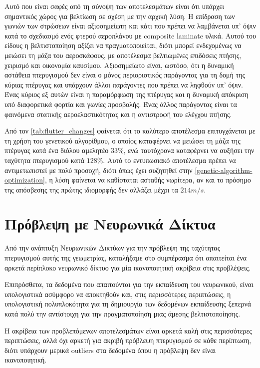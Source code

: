 Αυτό που είναι σαφές από τη σύνοψη των αποτελεσμάτων είναι ότι υπάρχει σημαντικός χώρος για βελτίωση σε σχέση με την αρχική λύση. 
Η επίδραση των γωνιών των στρώσεων είναι αξιοσημείωτη και κάτι που πρέπει να λαμβάνεται υπ' όψιν κατά το σχεδιασμό ενός φτερού αεροπλάνου με \textlatin{composite laminate} υλικά.
Αυτού του είδους η βελτιστοποίηση αξίζει να πραγματοποιείται, διότι μπορεί ενδεχομένως να μειώσει τη μάζα του αεροσκάφους, με αποτέλεσμα βελτιωμένες επιδόσεις πτήσης, χειρισμό και οικονομία καυσίμου.
Αξιοσημείωτο είναι, ωστόσο, ότι η δυναμική αστάθεια πτερυγισμού δεν είναι ο μόνος περιοριστικός παράγοντας για τη δομή της κύριας πτέρυγας και υπάρχουν άλλοι παράγοντες που πρέπει να ληφθούν υπ' όψιν. 
Ένας κύριος εξ αυτών είναι η παραμόρφωση της πτέρυγας και η δυναμική απόκριση υπό διαφορετικά φορτία και γωνίες προσβολής.
Ένας άλλος παράγοντας είναι τα φαινόμενα στατικής αεροελαστικότητας και η αντιστροφή του ελέγχου πτήσης.

Από τον \autoref{tab:flutter_changes} φαίνεται ότι το καλύτερο αποτέλεσμα επιτυγχάνεται με τη χρήση του γενετικού αλγορίθμου, ο οποίος καταφέρνει να μειώσει τη μάζα της πτέρυγας κατά
ένα διόλου αμελητέο $33\%$, ενώ ταυτόχρονα καταφέρνει να αυξήσει την ταχύτητα πτερυγισμού κατά $128\%$.
Αυτό το εντυπωσιακό αποτέλεσμα πρέπει να αντιμετωπιστεί με πολύ προσοχή, 
διότι όπως έχει συζητηθεί στην \autoref{genetic-algorithm-optimization}, η λύση φαίνεται
να καθίσταται ασταθής νωρίτερα, αν και το πρόσημο της απόσβεσης της πρώτης ιδιομορφής δεν αλλάζει μέχρι τα $214 m/s$.

\section{Πρόβλεψη με Νευρωνικά Δίκτυα}
\label{neural-network-prediction.}

Από την ανάπτυξη Νευρωνικών Δικτύων για την πρόβλεψη της ταχύτητας πτερυγισμού αυτής της γεωμετρίας, 
καταλήξαμε στο συμπέρασμα ότι απαιτείται ένα αρκετά περίπλοκο νευρωνικό δίκτυο 
για μία ικανοποιητική ακρίβεια στις προβλέψεις.

Επιπρόσθετα, τα δεδομένα που απαιτούνται για την εκπαίδευση του νευρωνικού, 
είναι υπολογιστικά ασύμφορο να αποκτηθούν και, 
στις περισσότερες περιπτώσεις, η υπολογιστική πολυπλοκότητα για τη δημιουργία 
των δεδομένων εκπαίδευσης ξεπερνά κατά πολύ
την αντίστοιχη για την πραγματοποίηση μιας άμεσης βελτιστοποίησης.

Η ακρίβεια των προβλεπόμενων αποτελεσμάτων είναι αρκετά καλή στις περισσότερες περιπτώσεις, 
αλλά όχι αρκετή για ακριβή πρόβλεψη πτερυγισμού σε κάθε περίπτωση, 
διότι υπάρχουν μερικά \textlatin{outliers} στα δεδομένα όπου η πρόβλεψη δεν είναι ικανοποιητική.

